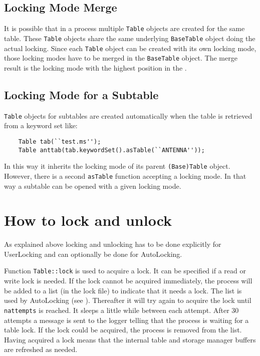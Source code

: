 \subsection{Locking Mode Merge}
It is possible that in a process multiple \texttt{Table} objects are created
for the same table. These \texttt{Table} objects share the same underlying
\texttt{BaseTable} object doing the actual locking.
Since each \texttt{Table} object can be created with its own locking mode,
those locking modes have to be merged in the \texttt{BaseTable} object.
The merge result is the locking mode with the highest position in the
.

\subsection{Locking Mode for a Subtable}
\texttt{Table} objects for subtables are created automatically
when the table is retrieved from a keyword set like:
\begin{verbatim}
    Table tab(``test.ms'');
    Table anttab(tab.keywordSet().asTable(``ANTENNA''));
\end{verbatim}
In this way it inherits the locking mode of its parent
\texttt{(Base)Table} object.
\\However, there is a second \texttt{asTable} function accepting
a locking mode. In that way a subtable can be opened with a given
locking mode.

\section{How to lock and unlock}
As explained above locking and unlocking has to
be done explicitly for UserLocking and can optionally be done for
AutoLocking.

Function \texttt{Table::lock} is used to acquire a lock. It can be
specified if a read or write lock is needed.
If the lock cannot be acquired immediately, the process will be added
to a list (in the lock file) to indicate that it needs a lock. The
list is used by AutoLocking (see ).
Thereafter it will try again to acquire the lock until
\texttt{nattempts} is reached. It sleeps a little while between each
attempt. After 30 attempts a message is sent to the logger telling
that the process is waiting for a table lock.
If the lock could be acquired, the process is removed from the list.
\\Having acquired a lock means that the
internal table and storage manager buffers are refreshed as needed.

